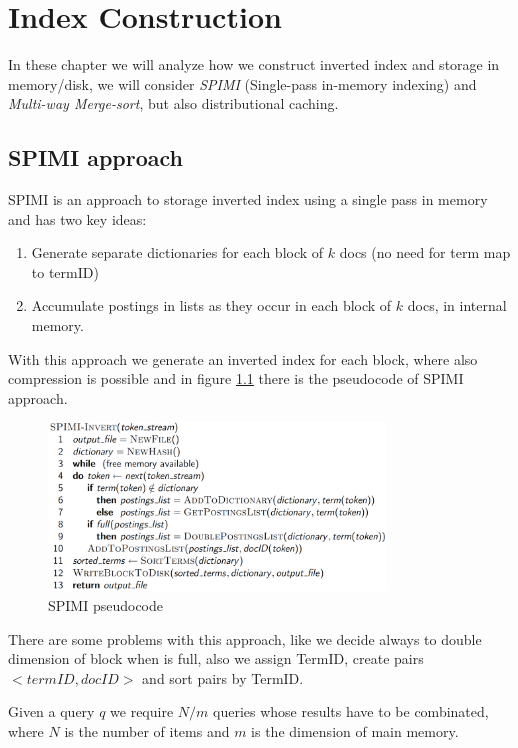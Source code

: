\chapter{Index Construction}
In these chapter we will analyze how we construct inverted index and storage in memory/disk, we will consider 
\emph{SPIMI} (Single-pass in-memory indexing) and \emph{Multi-way Merge-sort}, but also distributional caching.

\section{SPIMI approach}
SPIMI is an approach to storage inverted index using a single pass in memory and has two key ideas:
\begin{enumerate}
	\item Generate separate dictionaries for each block of $k$ docs (no need for term map to termID)
	\item Accumulate postings in lists as they occur in each block of $k$ docs, in internal memory.
\end{enumerate}
With this approach we generate an inverted index for each block, where also compression is possible and 
in figure \ref{img:spimi} there is the pseudocode of SPIMI approach.

\begin{figure}
	\includegraphics[width=0.8\textwidth]{Images/spimi}
	\caption{SPIMI pseudocode}
	\label{img:spimi}
\end{figure}
There are some problems with this approach, like we decide always to double dimension of block when is full, also 
we assign TermID, create pairs $<termID, docID>$ and sort pairs by TermID.

Given a query $q$ we require $N / m$ queries whose results have to be combinated, where $N$ is the number of items 
and $m$ is the dimension of main memory.

